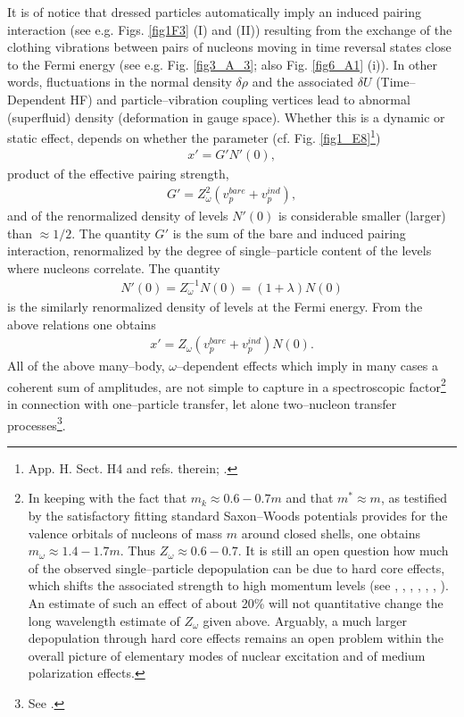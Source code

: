 It is of notice that dressed particles automatically imply an induced pairing interaction (see e.g. Figs. \ref{fig1F3} (I) and (II)) resulting from the exchange of the clothing vibrations between pairs of nucleons moving in time reversal states close to the Fermi energy (see e.g. Fig. \ref{fig3_A_3}; also Fig. \ref{fig6_A1} (i)). In other words, fluctuations in the normal density $\delta \rho$ and the associated $\delta U$ (Time--Dependent HF) and particle--vibration coupling vertices lead to abnormal (superfluid) density (deformation in gauge space). Whether this is a dynamic or static effect, depends on whether the parameter (cf. Fig. \ref{fig1_E8}\footnote{\cite{Brink:05} App. H. Sect. H4 and refs. therein; \cite{Barranco:05}.}) 
\begin{align}\label{eq2_1_10}
x'=G'N'(0),  
\end{align}
product of the effective pairing strength, 
\begin{align}\label{eq2_2_2}
G'=Z_\omega^2(v_p^{bare}+v_p^{ind}),
\end{align}
and of the renormalized density of levels $N'(0)$ is considerable smaller  (larger) than $\approx1/2$. The quantity $G'$ is the sum of the bare and induced pairing interaction, renormalized by the degree of single--particle content of the levels where nucleons correlate. The quantity 
\begin{align}
N'(0)=Z_\omega^{-1}N(0)=(1+\lambda)N(0)
\end{align}
is the similarly renormalized density of levels at the Fermi energy. From the above relations one obtains 
\begin{align}
x'=Z_\omega(v_p^{bare}+v_p^{ind})N(0).
\end{align}
All of the above many--body, $\omega$--dependent effects which imply in many cases a coherent sum of amplitudes, are not simple to capture in a spectroscopic factor\footnote{In keeping with the fact that $m_k\approx 0.6-0.7 m$ and that $m^*\approx m$, as testified by the satisfactory fitting standard Saxon--Woods potentials provides for the valence orbitals of nucleons of mass $m$ around closed shells, one obtains $m_\omega\approx 1.4-1.7 m$. Thus $Z_\omega \approx 0.6-0.7$. It is still an open question how much of the observed single--particle depopulation can be due to hard core effects, which shifts the associated strength to high momentum levels (see \cite{Dickhoff:05}, \cite{Jenning:11}, \cite{Kramer:01}, \cite{Barbieri:09}, \cite{Schiffer:12}, \cite{Duguet:12}, \cite{Furnstahl:10}).  An estimate of such an effect of about 20\% will not quantitative change the long wavelength estimate of $Z_\omega$ given above. Arguably, a much larger depopulation through hard core effects remains an open problem within the overall picture of elementary modes of nuclear excitation and of medium polarization effects.} in connection with one--particle transfer, let alone two--nucleon transfer processes\footnote{See \cite{Barranco:05,Barranco:99}.}. 






